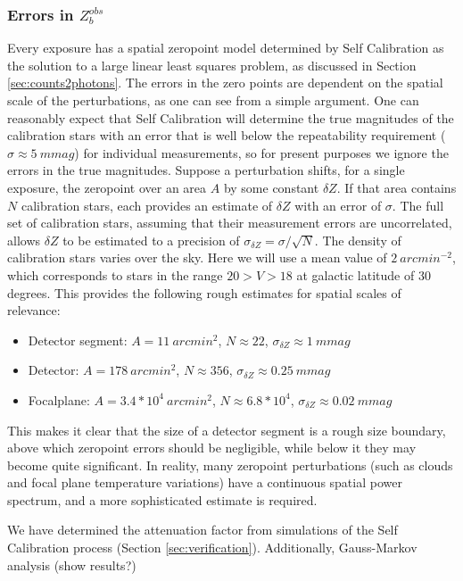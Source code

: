 \documentclass[12pt,preprint]{aastex}
\begin{document}
\subsubsection{Errors in $Z_b^{obs}$}
Every exposure has a spatial zeropoint model determined by Self Calibration as the solution to a large linear least squares problem, as discussed in Section \ref{sec:counts2photons}.  The errors in the zero points are dependent on the spatial scale of the perturbations, as one can see from a simple argument.  One can reasonably expect that Self Calibration will determine the true magnitudes of the calibration stars with an error that is well below the repeatability requirement ($\sigma \approx 5~mmag$) for individual measurements, so for present purposes we ignore the errors in the true magnitudes.  Suppose a perturbation shifts, for a single exposure, the zeropoint over an area $A$ by some constant $\delta Z$.   If that area contains $N$ calibration stars, each provides an estimate of $\delta Z$ with an error of $\sigma$.   The full set of calibration stars, assuming that their measurement errors are uncorrelated, allows $\delta Z$ to be estimated to a precision of $\sigma_{\delta Z} = \sigma / \sqrt{N}$.  The density of calibration stars varies over the sky.  Here we will use a mean value of $2~arcmin^{-2}$, which corresponds to stars in the range $20 > V > 18$ at galactic latitude of 30 degrees. This provides the following rough estimates for spatial scales of relevance:
\begin{itemize}
\item{Detector segment:  $A=11~arcmin^2$, $N \approx 22$, $\sigma_{\delta Z} \approx 1~mmag$}
\item{Detector: $A=178~arcmin^2$, $N \approx 356$, $\sigma_{\delta Z} \approx 0.25~mmag$}
\item{Focalplane: $A=3.4*10^4~arcmin^2$, $N \approx 6.8*10^4$, $\sigma_{\delta Z} \approx 0.02~mmag$}
\end{itemize}
This makes it clear that the size of a detector segment is a rough size boundary, above which zeropoint errors should be negligible,
while below it they may become quite significant.  In reality, many zeropoint perturbations (such as clouds and focal plane temperature variations) have a continuous spatial power spectrum, and a more sophisticated estimate is required.  

We have determined the attenuation factor from simulations of the Self Calibration process (Section \ref{sec:verification}).   Additionally, Gauss-Markov analysis (show results?)
\end{document}

